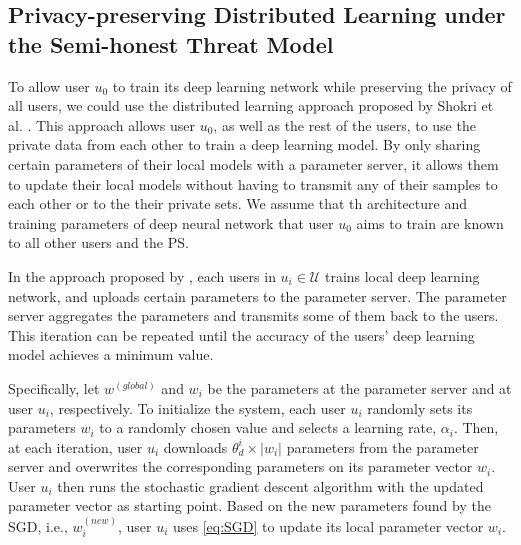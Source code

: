 \documentclass[conference]{IEEEtran}
\begin{document}
\subsection{Privacy-preserving Distributed Learning under the Semi-honest Threat Model}
To allow user $u_0$ to train its deep learning network while preserving the privacy of all users, we could use the distributed
learning approach proposed by Shokri et al. \cite{shokri2015privacy}. This approach allows user $u_0$, as well as the rest of the users, 
to use the private data from each other to train a deep learning model. By only sharing certain parameters of their local models
with a parameter server, it allows them to update their local models without having to transmit any of their samples to each other
or to the their private sets. We assume that th architecture and training parameters of  deep neural network that user $u_0$ aims to
train are known  to all other users and the PS.

In the approach proposed by \cite{shokri2015privacy}, each users in $u_i\in\mathcal{U}$ trains local deep learning
network, and uploads certain parameters to the parameter server. The parameter server aggregates the parameters and transmits some of
them back to the users. This iteration can be repeated until the accuracy of the users' deep learning model achieves a minimum value. 

Specifically, let  $w^{(global)}$ and $w_i$ be the parameters at the parameter server and at user $u_i$, respectively. 
To initialize the system,  each user $u_i$ randomly sets its parameters $w_i$ to a randomly chosen value and selects a learning rate,
$\alpha_i$. Then, at each iteration,  user $u_i$  downloads $\theta_d^{i} \times |w_i|$ parameters from the parameter server and
overwrites the corresponding parameters on its parameter vector $w_i$. User $u_i$ then runs the stochastic gradient descent algorithm
with the updated parameter vector as starting point. Based on the new parameters found by the SGD, i.e., $w_i^{(new)}$, user
$u_i$ uses \eqref{eq:SGD} to update its local parameter vector $w_i$. 
\end{document}
